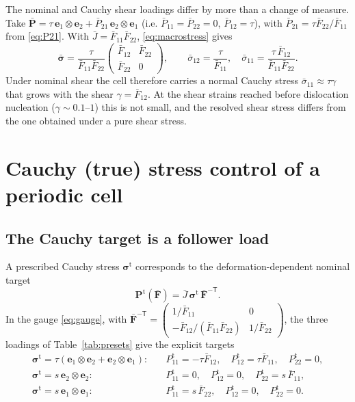 \documentclass[11pt,a4paper]{article}
\newcommand{\Fb}{\bar{\mathbf F}}
\newcommand{\Pb}{\bar{\mathbf P}}
\newcommand{\sigb}{\bar{\bm\sigma}}
\newcommand{\Pt}{\mathbf P^{\mathrm t}}
\newcommand{\sigt}{\bm\sigma^{\mathrm t}}
\begin{document}
The nominal and Cauchy shear loadings differ by more than a change of measure. Take
\(\Pb=\tau\,\mathbf e_1\otimes\mathbf e_2+\bar P_{21}\,\mathbf e_2\otimes\mathbf e_1\) (i.e.
\(\bar P_{11}=\bar P_{22}=0\), \(\bar P_{12}=\tau\)), with \(\bar P_{21}=\tau\bar F_{22}/\bar F_{11}\)
from \eqref{eq:P21}. With \(\bar J=\bar F_{11}\bar F_{22}\), \eqref{eq:macrostress} gives
\begin{equation}
  \sigb=\frac{\tau}{\bar F_{11}\bar F_{22}}
  \begin{pmatrix}\bar F_{12}&\bar F_{22}\\ \bar F_{22}&0\end{pmatrix},\qquad
  \bar\sigma_{12}=\frac{\tau}{\bar F_{11}},\quad
  \bar\sigma_{11}=\frac{\tau\,\bar F_{12}}{\bar F_{11}\bar F_{22}} .
  \label{eq:nominalshear}
\end{equation}
Under nominal shear the cell therefore carries a normal Cauchy stress
\(\bar\sigma_{11}\approx\tau\gamma\) that grows with the shear \(\gamma=\bar F_{12}\). At the shear
strains reached before dislocation nucleation (\(\gamma\sim0.1\)--\(1\)) this is not small, and the
resolved shear stress differs from the one obtained under a pure shear stress.

\section{Cauchy (true) stress control of a periodic cell}
\label{sec:cauchy}

\subsection{The Cauchy target is a follower load}

A prescribed Cauchy stress \(\sigt\) corresponds to the deformation-dependent nominal target
\begin{equation}
  \Pt(\Fb)=\bar J\,\sigt\,\Fb^{-\mathsf T}.
  \label{eq:Ptsig}
\end{equation}
In the gauge \eqref{eq:gauge}, with
\(\Fb^{-\mathsf T}=\begin{pmatrix}1/\bar F_{11}&0\\-\bar F_{12}/(\bar F_{11}\bar F_{22})&1/\bar F_{22}\end{pmatrix}\),
the three loadings of Table~\ref{tab:presets} give the explicit targets
\begin{align}
  \sigt=\tau(\mathbf e_1\otimes\mathbf e_2+\mathbf e_2\otimes\mathbf e_1):&\quad
  P^{\mathrm t}_{11}=-\tau\bar F_{12},\quad P^{\mathrm t}_{12}=\tau\bar F_{11},\quad P^{\mathrm t}_{22}=0,
  \label{eq:Ptshear}\\
  \sigt=s\,\mathbf e_2\otimes\mathbf e_2:&\quad
  P^{\mathrm t}_{11}=0,\quad P^{\mathrm t}_{12}=0,\quad P^{\mathrm t}_{22}=s\,\bar F_{11},
  \label{eq:Ptyy}\\
  \sigt=s\,\mathbf e_1\otimes\mathbf e_1:&\quad
  P^{\mathrm t}_{11}=s\,\bar F_{22},\quad P^{\mathrm t}_{12}=0,\quad P^{\mathrm t}_{22}=0 .
  \label{eq:Ptxx}
\end{align}
\end{document}

